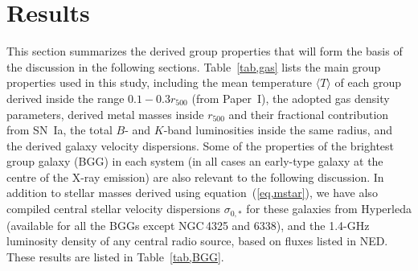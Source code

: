 \documentclass[useAMS,usenatbib]{mn2e}
\begin{document}
\section{Results}\label{sec,results}

This section summarizes the derived group properties that will form
the basis of the discussion in the following sections.
Table~\ref{tab,gas} lists the main group properties used in this
study, including the mean temperature $\langle T \rangle$ of each
group derived inside the range $0.1-0.3r_{500}$ (from Paper~I), the
adopted gas density parameters, derived metal masses inside $r_{500}$
and their fractional contribution from SN~Ia, the total $B$- and
$K$-band luminosities inside the same radius, and the derived galaxy
velocity dispersions. Some of the properties of the brightest group
galaxy (BGG) in each system (in all cases an early-type galaxy at the
centre of the X-ray emission) are also relevant to the following
discussion.  In addition to stellar masses derived using
equation~(\ref{eq,mstar}), we have also compiled central stellar
velocity dispersions $\sigma_{0,\ast}$ for these galaxies from
Hyperleda (available for all the BGGs except NGC\,4325 and 6338), and
the 1.4-GHz luminosity density of any central radio source, based on
fluxes listed in NED. These results are listed in Table~\ref{tab,BGG}.
\end{document}
